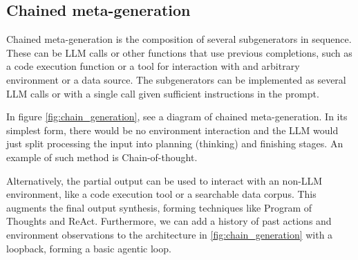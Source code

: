 \subsection{Chained meta-generation}

Chained meta-generation is the composition of several subgenerators in sequence. 
These can be LLM calls or other functions that use previous completions, such as a code execution function\cite{chen2023programthoughtspromptingdisentangling}
or a tool for interaction with and arbitrary environment or a data source\cite{yao2023reactsynergizingreasoningacting}.
The subgenerators can be implemented as several LLM calls or with a single call given sufficient instructions in the prompt\cite{khattab2023dspycompilingdeclarativelanguage}.

In figure \ref{fig:chain_generation}, see a diagram of chained meta-generation. In its simplest form, there would be no environment interaction and the LLM would just 
split processing the input into planning (thinking) and finishing stages. An example of such method is Chain-of-thought\cite{NEURIPS2022_8bb0d291}\cite{wei2023chainofthoughtpromptingelicitsreasoning}.

Alternatively, the partial output can be used to interact with an non-LLM environment, like a code execution tool or a searchable data corpus.
This augments the final output synthesis, forming techniques like Program of Thoughts\cite{chen2023programthoughtspromptingdisentangling} and ReAct\cite{yao2023reactsynergizingreasoningacting}.
Furthermore, we can add a history of past actions and environment observations to the architecture in \ref{fig:chain_generation} with a loopback, forming a basic agentic loop.

